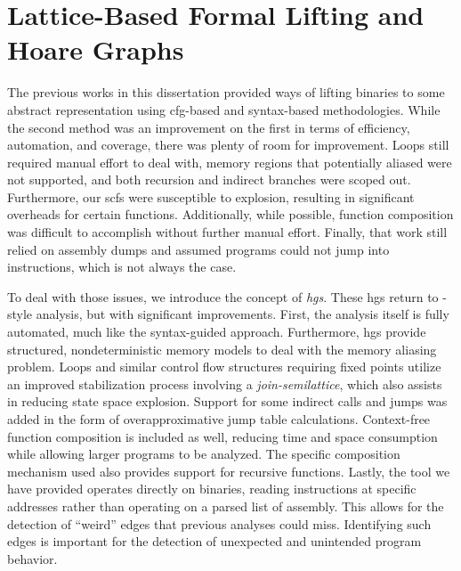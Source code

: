 \chapter{Lattice-Based Formal Lifting and Hoare Graphs}\label{ch:hg-lifting}
The previous works in this dissertation provided ways of lifting binaries to some abstract representation using \ac{cfg}-based and syntax-based methodologies.
While the second method was an improvement on the first in terms of efficiency, automation, and coverage, there was plenty of room for improvement.
Loops still required manual effort to deal with, memory regions that potentially aliased were not supported, and both recursion and indirect branches were scoped out.
Furthermore, our \acp{scf} were susceptible to explosion, resulting in significant overheads for certain functions.
Additionally, while possible, function composition was difficult to accomplish without further manual effort.
Finally, that work still relied on assembly dumps and assumed programs could not jump into instructions, which is not always the case.

To deal with those issues, we introduce the concept of \emph{\acp{hg}}.
These \acp{hg} return to -style analysis, but with significant improvements.
First, the analysis itself is fully automated, much like the syntax-guided approach.
Furthermore, \acp{hg} provide structured, nondeterministic memory models to deal with the memory aliasing problem. 
Loops and similar control flow structures requiring fixed points utilize an improved stabilization process involving a \emph{join-semilattice}, which also assists in reducing state space explosion.
Support for some indirect calls and jumps was added in the form of overapproximative jump table calculations.
Context-free function composition is included as well, reducing time and space consumption while allowing larger programs to be analyzed.
The specific composition mechanism used also provides support for recursive functions.
Lastly, the tool we have provided operates directly on binaries, reading instructions at specific addresses rather than operating on a parsed list of assembly.
This allows for the detection of ``weird'' edges  \autocite{shapiro2013weird,dullien2017weird} that previous analyses could miss.
Identifying such edges is important for the detection of unexpected and unintended program behavior.


